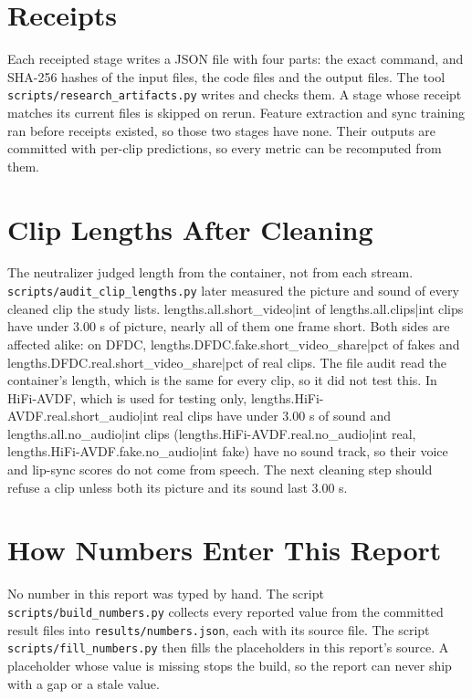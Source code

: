 \section{Receipts}

Each receipted stage writes a JSON file with four parts: the exact command,
and SHA-256 hashes of the input files, the code files and the output files.
The tool \texttt{scripts/research\_artifacts.py} writes and checks them. A
stage whose receipt matches its current files is skipped on rerun. Feature
extraction and sync training ran before receipts existed, so those two stages
have none. Their outputs are committed with per-clip predictions, so every
metric can be recomputed from them.

\section{Clip Lengths After Cleaning}
\label{sec:a-lengths}

The neutralizer judged length from the container, not from each stream.
\texttt{scripts/audit\_clip\_lengths.py} later measured the picture and sound
of every cleaned clip the study lists. {{lengths.all.short_video|int}} of
{{lengths.all.clips|int}} clips have under 3.00 s of picture, nearly all of
them one frame short. Both sides are affected alike: on DFDC,
{{lengths.DFDC.fake.short_video_share|pct}} of fakes and
{{lengths.DFDC.real.short_video_share|pct}} of real clips. The file audit read
the container's length, which is the same for every clip, so it did not test
this. In HiFi-AVDF, which is used for testing only,
{{lengths.HiFi-AVDF.real.short_audio|int}} real clips have under 3.00 s of
sound and {{lengths.all.no_audio|int}} clips
({{lengths.HiFi-AVDF.real.no_audio|int}} real,
{{lengths.HiFi-AVDF.fake.no_audio|int}} fake) have no sound track, so their
voice and lip-sync scores do not come from speech. The next cleaning step
should refuse a clip unless both its picture and its sound last 3.00 s.

\section{How Numbers Enter This Report}

No number in this report was typed by hand. The script
\texttt{scripts/build\_numbers.py} collects every reported value from the
committed result files into \texttt{results/numbers.json}, each with its
source file. The script \texttt{scripts/fill\_numbers.py} then fills the
placeholders in this report's source. A placeholder whose value is missing
stops the build, so the report can never ship with a gap or a stale value.

